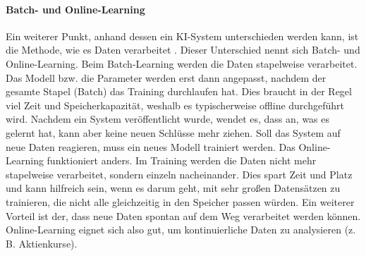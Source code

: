\paragraph{Batch- und Online-Learning}
Ein weiterer Punkt, anhand dessen ein KI-System unterschieden
werden kann, ist die Methode, wie es Daten verarbeitet \parencite[15]{book:hands-on-ml}.
Dieser Unterschied nennt sich Batch- und Online-Learning.
Beim Batch-Learning werden die Daten stapelweise verarbeitet.
Das Modell bzw. die Parameter werden erst dann angepasst,
nachdem der gesamte Stapel (Batch) das Training durchlaufen hat.
Dies braucht in der Regel viel Zeit und Speicherkapazität, weshalb
es typischerweise offline durchgeführt wird.
Nachdem ein System veröffentlicht wurde, wendet es, dass an, was es gelernt hat,
kann aber keine neuen Schlüsse mehr ziehen.
Soll das System auf neue Daten reagieren, muss ein neues Modell trainiert werden.
Das Online-Learning funktioniert anders.
Im Training werden die Daten nicht mehr stapelweise verarbeitet,
sondern einzeln nacheinander.
Dies spart Zeit und Platz und kann hilfreich sein, wenn es darum geht,
mit sehr großen Datensätzen zu trainieren, die nicht alle gleichzeitig
in den Speicher passen würden.
Ein weiterer Vorteil ist der, dass neue Daten spontan auf dem Weg
verarbeitet werden können. Online-Learning eignet sich also gut,
um kontinuierliche Daten zu analysieren (z.\,B. Aktienkurse).

